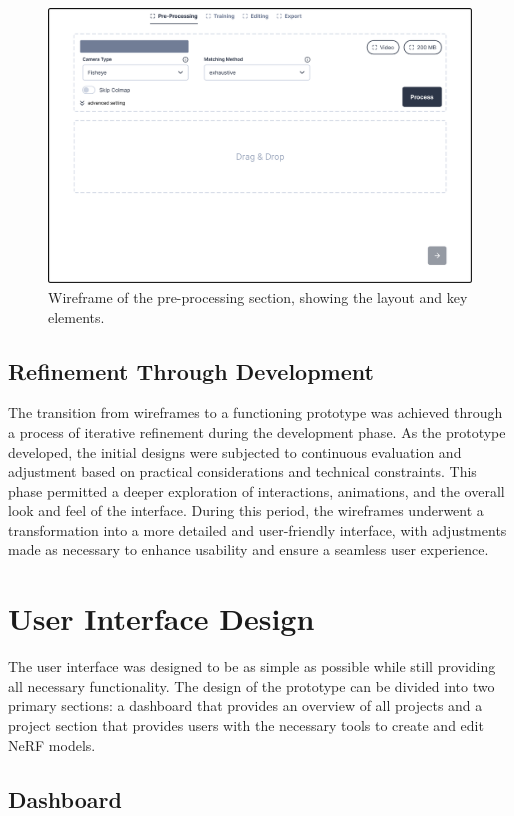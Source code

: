 \begin{figure}[h!]
  \centering
  \includegraphics[width=.8\textwidth]{figures/wireframe.png}
  \caption{Wireframe of the pre-processing section, showing the layout and key elements.}
  \label{fig:design:wireframe}
\end{figure}

\subsection*{Refinement Through Development}

The transition from wireframes to a functioning prototype was achieved through a process of iterative refinement during the development phase.
As the prototype developed, the initial designs were subjected to continuous evaluation and adjustment based on practical considerations and technical constraints.
This phase permitted a deeper exploration of interactions, animations, and the overall look and feel of the interface.
During this period, the wireframes underwent a transformation into a more detailed and user-friendly interface, with adjustments made as necessary to enhance usability and ensure a seamless user experience.

\section{User Interface Design}
The user interface was designed to be as simple as possible while still providing all necessary functionality.
The design of the prototype can be divided into two primary sections: a dashboard that provides an overview of all projects and a project section that provides users with the necessary tools to create and edit NeRF models.

\subsection*{Dashboard}

